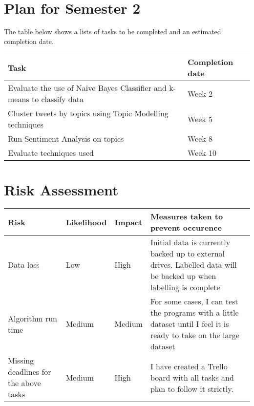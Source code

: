 
\chapter{Plan for Semester 2}
\label{cha:plansem2}

The table below shows a lists of tasks to be completed and an estimated completion date.

\begin{center}
  \begin{tabular}{| l | l |}
    \hline
    \textbf{Task} & \textbf{Completion date} \\ \hline
    Evaluate the use of Naive Bayes Classifier and k-means to classify data & Week 2 \\ \hline
    Cluster tweets by topics using Topic Modelling techniques & Week 5 \\ \hline
    Run Sentiment Analysis on topics & Week 8 \\ \hline
    Evaluate techniques used & Week 10 \\ \hline
  \end{tabular}
\end{center}


\chapter{Risk Assessment}
\label{cha:risk-assessment}

\begin{center}
  \begin{tabular}{| l | l | l | p{5cm} |}
    \hline
    \textbf{Risk} & \textbf{Likelihood} & \textbf{Impact} & \textbf{Measures taken to prevent occurence} \\ \hline
    Data loss & Low & High & Initial data is currently backed up to external drives. Labelled data
    will be backed up when labelling is complete \\ \hline

    Algorithm run time & Medium & Medium & For some cases, I can test the programs with a little
    dataset until I feel it is ready to take on the large dataset \\ \hline

    Missing deadlines for the above tasks & Medium & High & I have created a Trello board with all
    tasks and plan to follow it strictly. \\ \hline
  \end{tabular}
\end{center}
